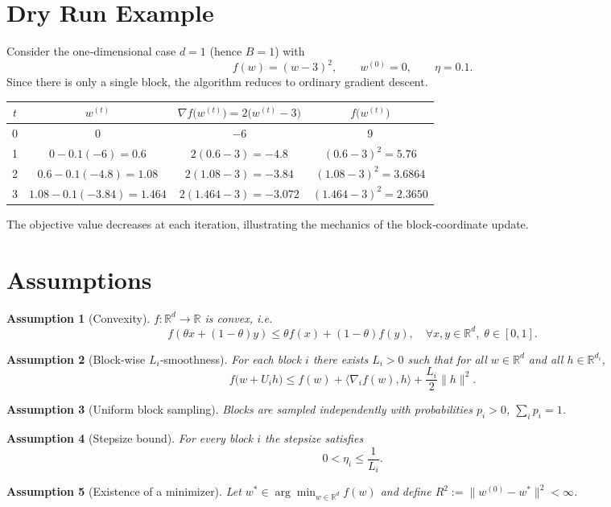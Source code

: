 \documentclass{article}
\newtheorem{assumption}{Assumption}
\newcommand{\R}{\mathbb{R}}
\begin{document}
\section*{Dry Run Example}
Consider the one‑dimensional case $d=1$ (hence $B=1$) with
\[
f(w)=(w-3)^{2},\qquad w^{(0)}=0,\qquad \eta=0.1 .
\]
Since there is only a single block, the algorithm reduces to ordinary gradient
descent.

\begin{center}
\begin{tabular}{c|c|c|c}
$t$ & $w^{(t)}$ & $\nabla f\!\big(w^{(t)}\big)=2\big(w^{(t)}-3\big)$ & $f\!\big(w^{(t)}\big)$\\ \hline
0 & $0$ & $-6$ & $9$\\
1 & $0-0.1(-6)=0.6$ & $2(0.6-3)=-4.8$ & $(0.6-3)^{2}=5.76$\\
2 & $0.6-0.1(-4.8)=1.08$ & $2(1.08-3)=-3.84$ & $(1.08-3)^{2}=3.6864$\\
3 & $1.08-0.1(-3.84)=1.464$ & $2(1.464-3)=-3.072$ & $(1.464-3)^{2}=2.3650$
\end{tabular}
\end{center}
The objective value decreases at each iteration, illustrating the
mechanics of the block‑coordinate update.

\newpage
\section*{Assumptions}
\begin{assumption}[Convexity]
$f:\R^{d}\rightarrow\R$ is convex, i.e.
\[
f(\theta x+(1-\theta)y)\le \theta f(x)+(1-\theta)f(y),\quad
\forall x,y\in\R^{d},\;\theta\in[0,1].
\]
\end{assumption}
\begin{assumption}[Block‑wise $L_i$‑smoothness]
For each block $i$ there exists $L_i>0$ such that for all $w\in\R^{d}$ and
all $h\in\R^{d_i}$,
\[
f\big(w+U_i h\big)\le f(w)+\langle \nabla_i f(w),h\rangle
+\frac{L_i}{2}\|h\|^{2}. \tag{A1}
\]
\end{assumption}
\begin{assumption}[Uniform block sampling]
Blocks are sampled independently with probabilities $p_i>0$, $\sum_i p_i=1$.
\end{assumption}
\begin{assumption}[Stepsize bound]
For every block $i$ the stepsize satisfies
\[
0<\eta_i\le\frac{1}{L_i}. \tag{A2}
\]
\end{assumption}
\begin{assumption}[Existence of a minimizer]
Let $w^{*}\in\arg\min_{w\in\R^{d}} f(w)$ and define $R^{2}:=
\|w^{(0)}-w^{*}\|^{2}<\infty$.
\end{assumption}
\end{document}
